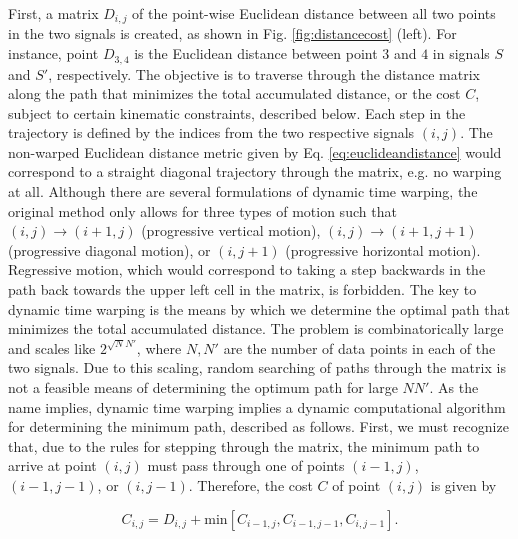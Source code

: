 			
			First, a matrix $D_{i,j}$ of the point-wise Euclidean distance between all two points in the two signals is created, as shown in Fig. \ref{fig:distancecost} (left). For instance, point $D_{3,4}$ is the Euclidean distance between point $3$ and $4$ in signals $S$ and $S'$, respectively. The objective is to traverse through the distance matrix along the path that minimizes the total accumulated distance, or the cost $C$, subject to certain kinematic constraints, described below. Each step in the trajectory is defined by the indices from the two respective signals $\left(i,j\right)$. The non-warped Euclidean distance metric given by Eq. \ref{eq:euclideandistance} would correspond to a straight diagonal trajectory through the matrix, e.g. no warping at all. Although there are several formulations of dynamic time warping, the original method only allows for three types of motion such that $\left(i,j\right)\rightarrow\left(i+1,j\right)$ (progressive vertical motion), $\left(i,j\right)\rightarrow\left(i+1,j+1\right)$ (progressive diagonal motion), or $\left(i,j+1\right)$ (progressive horizontal motion). Regressive motion, which would correspond to taking a step backwards in the path back towards the upper left cell in the matrix, is forbidden. The key to dynamic time warping is the means by which we determine the optimal path that minimizes the total accumulated distance. The problem is combinatorically large and scales like $2^{\sqrt NN'}$, where $N, N'$ are the number of data points in each of the two signals. Due to this scaling, random searching of paths through the matrix is not a feasible means of determining the optimum path for large $NN'$. As the name implies, dynamic time warping implies a dynamic computational algorithm for determining the minimum path, described as follows. First, we must recognize that, due to the rules for stepping through the matrix, the minimum path to arrive at point $\left(i,j\right)$ must pass through one of points $\left(i-1,j\right)$, $\left(i-1,j-1\right)$, or $\left(i,j-1\right)$. Therefore, the cost $C$ of point $\left(i,j\right)$ is given by
			
			\begin{equation}\label{eq:dtwcost}
			C_{i,j}=D_{i,j}+\mathrm{min}\left[C_{i-1,j}, C_{i-1,j-1}, C_{i,j-1}\right].
			\end{equation}
			
